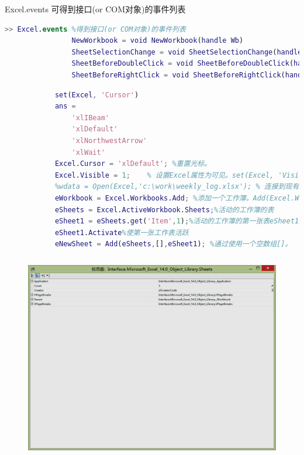             Excel.events 可得到接口(or COM对象)的事件列表
            \begin{lstlisting}[language=Matlab]
            >> Excel.events %得到接口(or COM对象)的事件列表
                NewWorkbook = void NewWorkbook(handle Wb)
                SheetSelectionChange = void SheetSelectionChange(handle Sh, handle Target)
                SheetBeforeDoubleClick = void SheetBeforeDoubleClick(handle Sh, handle Target, bool Cancel)
                SheetBeforeRightClick = void SheetBeforeRightClick(handle Sh, handle Target, bool Cancel)
            \end{lstlisting}
            \begin{lstlisting}[language=Matlab]
            %查看属性Cursor的所有可选属性值。Excel.set('属性', '属性值')
            set(Excel, 'Cursor')
            ans =
                'xlIBeam'
                'xlDefault'
                'xlNorthwestArrow'
                'xlWait'
            Excel.Cursor = 'xlDefault'; %重置光标。
            Excel.Visible = 1;    % 设置Excel属性为可见。set(Excel, 'Visible', 1);
            %wdata = Open(Excel,'c:\work\weekly_log.xlsx'); % 连接到现有Excel应用程序
            eWorkbook = Excel.Workbooks.Add; %添加一个工作簿。Add(Excel.Workbooks);
            eSheets = Excel.ActiveWorkbook.Sheets;%活动的工作簿的表
            eSheet1 = eSheets.get('Item',1);%活动的工作簿的第一张表eSheet1 = Item(eSheets,1);
            eSheet1.Activate%使第一张工作表活跃
            eNewSheet = Add(eSheets,[],eSheet1); %通过使用一个空数组[]。
            \end{lstlisting}
            \begin{figure}[H]
            \centering
            \includegraphics[height=9cm]{images/Link_11.jpg}
            \label{fig:Link_11}
            \end{figure}
